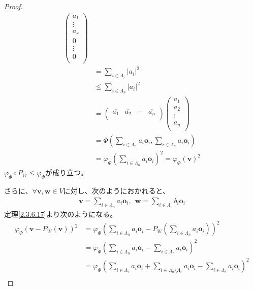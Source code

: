 \documentclass[dvipdfmx]{jsarticle}
\begin{document}
\begin{proof}
\begin{align*}
\begin{pmatrix}
a_{1} \\
 \vdots \\
a_{r} \\
0 \\
 \vdots \\
0 \\
\end{pmatrix}\\
&= \sum_{i \in \varLambda_{r}} \left| a_{i} \right|^{2}\\
&\leq \sum_{i \in \varLambda_{n}} \left| a_{i} \right|^{2}\\
&= \begin{pmatrix}
\overline{a_{1}} & \overline{a_{2}} & \cdots & \overline{a_{n}} \\
\end{pmatrix}\begin{pmatrix}
a_{1} \\
a_{2} \\
 \vdots \\
a_{n} \\
\end{pmatrix}\\
&= \varPhi \left( \sum_{i \in \varLambda_{n}} {a_{i}\mathbf{o}_{i}},\sum_{i \in \varLambda_{n}} {a_{i}\mathbf{o}_{i}} \right)\\
&= {\varphi_{\varPhi }\left( \sum_{i \in \varLambda_{n}} {a_{i}\mathbf{o}_{i}} \right)}^{2} = {\varphi_{\varPhi }\left( \mathbf{v} \right)}^{2}
\end{align*}
$\varphi_{\varPhi } \circ P_{W} \leq \varphi_{\varPhi }$が成り立つ。\par
さらに、$\forall\mathbf{v},\mathbf{w} \in V$に対し、次のようにおかれると、
\begin{align*}
\mathbf{v} = \sum_{i \in \varLambda_{n}} {a_{i}\mathbf{o}_{i}},\ \ \mathbf{w} = \sum_{i \in \varLambda_{r}} {b_{i}\mathbf{o}_{i}}
\end{align*}
定理\ref{2.3.6.17}より次のようになる。
\begin{align*}
{\varphi_{\varPhi }\left( \mathbf{v} - P_{W}\left( \mathbf{v} \right) \right)}^{2} &= {\varphi_{\varPhi }\left( \sum_{i \in \varLambda_{n}} {a_{i}\mathbf{o}_{i}} - P_{W}\left( \sum_{i \in \varLambda_{n}} {a_{i}\mathbf{o}_{i}} \right) \right)}^{2}\\
&= {\varphi_{\varPhi }\left( \sum_{i \in \varLambda_{n}} {a_{i}\mathbf{o}_{i}} - \sum_{i \in \varLambda_{r}} {a_{i}\mathbf{o}_{i}} \right)}^{2}\\
&= {\varphi_{\varPhi }\left( \sum_{i \in \varLambda_{r}} {a_{i}\mathbf{o}_{i}} + \sum_{i \in \varLambda_{n} \setminus \varLambda_{r}} {a_{i}\mathbf{o}_{i}} - \sum_{i \in \varLambda_{r}} {a_{i}\mathbf{o}_{i}} \right)}^{2}\\

\end{align*}
\end{proof}
\end{document}
